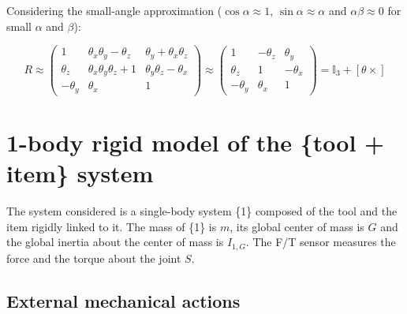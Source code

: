 \documentclass[\main/main.tex]{subfiles}
\begin{document}
Considering the small-angle approximation ($\cos \alpha \approx 1$, $\sin \alpha \approx \alpha$ and $\alpha \beta \approx 0$ for small $\alpha$ and $\beta$):

\begin{equation}
 R \approx
 \begin{pmatrix}
  1         & \theta_x \theta_y -\theta_z    & \theta_y + \theta_x \theta_z \\
  \theta_z  & \theta_x \theta_y \theta_z + 1 & \theta_y \theta_z -\theta_x  \\
  -\theta_y & \theta_x                       & 1
 \end{pmatrix}
 \approx
 \begin{pmatrix}
  1         & -\theta_z & \theta_y  \\
  \theta_z  & 1         & -\theta_x \\
  -\theta_y & \theta_x  & 1
 \end{pmatrix}
 = \mathbb{I}_3 + \left[ \theta \times \right]
\end{equation}

\newpage

\section{1-body rigid model of the \{tool + item\} system}

The system considered is a single-body system \{1\} composed of the tool and the item rigidly linked to it. The mass of \{1\} is $m$, its global center of mass is $G$ and the global inertia about the center of mass is $I_{1, G}$. The F/T sensor measures the force and the torque about the joint $S$.

\subsection{External mechanical actions}
\end{document}
